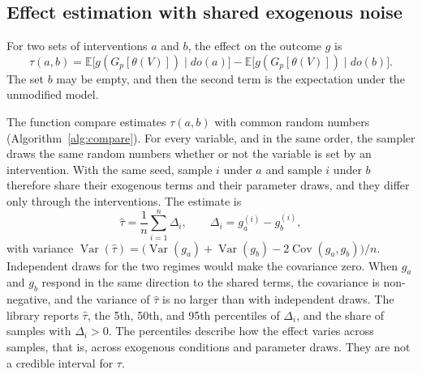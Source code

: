 \documentclass[12pt]{article}
\newcommand{\code}[1]{{\ttfamily\def\_{\textunderscore\allowbreak}#1}}
\theoremstyle{plain}
\theoremstyle{definition}
\begin{document}
\subsection{Effect estimation with shared exogenous noise}\label{sec:effect}

For two sets of interventions $a$ and $b$, the effect on the outcome $g$ is
\begin{equation}\label{eq:estimand}
    \tau(a,b)=\mathbb{E}\bigl[g(G_p[\theta(V)])\mid do(a)\bigr]-\mathbb{E}\bigl[g(G_p[\theta(V)])\mid do(b)\bigr].
\end{equation}
The set $b$ may be empty, and then the second term is the expectation under the unmodified model.

The function \code{compare} estimates $\tau(a,b)$ with common random numbers (Algorithm~\ref{alg:compare}). For every variable, and in the same order, the sampler draws the same random numbers whether or not the variable is set by an intervention. With the same seed, sample $i$ under $a$ and sample $i$ under $b$ therefore share their exogenous terms and their parameter draws, and they differ only through the interventions. The estimate is
\begin{equation}\label{eq:tauhat}
    \hat\tau=\frac{1}{n}\sum_{i=1}^{n}\Delta_i,\qquad \Delta_i=g_a^{(i)}-g_b^{(i)},
\end{equation}
with variance $\operatorname{Var}(\hat\tau)=\bigl(\operatorname{Var}(g_a)+\operatorname{Var}(g_b)-2\operatorname{Cov}(g_a,g_b)\bigr)/n$. Independent draws for the two regimes would make the covariance zero. When $g_a$ and $g_b$ respond in the same direction to the shared terms, the covariance is non-negative, and the variance of $\hat\tau$ is no larger than with independent draws. The library reports $\hat\tau$, the 5th, 50th, and 95th percentiles of $\Delta_i$, and the share of samples with $\Delta_i>0$. The percentiles describe how the effect varies across samples, that is, across exogenous conditions and parameter draws. They are not a credible interval for $\tau$.
\end{document}
